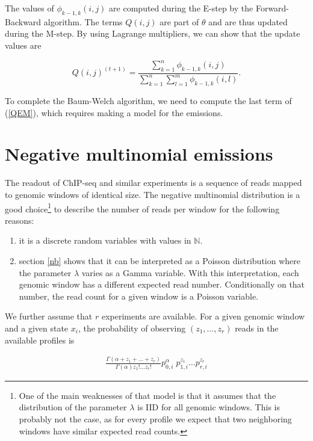 \documentclass[12pt]{article}
\begin{document}
\begin{appendices}
    The values of $\phi_{k-1,k}(i,j)$ are computed during the
    E-step by the Forward-Backward algorithm.
    The terms $Q(i,j)$ are part of $\theta$ and are thus updated
    during the M-step. By using Lagrange multipliers, we can show
    that the update values are

    $$ Q(i,j)^{(t+1)} = \frac{\sum_{k=1}^n \phi_{k-1,k}(i,j)}
      {\sum_{k=1}^n\sum_{l=1}^m\phi_{k-1,k}(i,l)}. $$
    
    To complete the Baum-Welch algorithm, we need to compute the last
    term of (\ref{QEM}), which requires making a model for the
    emissions.
    
    \section{Negative multinomial emissions}

    The readout of ChIP-seq and similar experiments is a sequence of
    reads mapped to genomic windows of identical size.
    The negative multinomial distribution is a good choice\footnote{One
    of the main weaknesses of that model is that it
    assumes that the distribution of the parameter $\lambda$ is IID
    for all genomic windows. This is probably not the case, as for
    every profile we expect that two neighboring windows have similar
    expected read counts.} to describe
    the number of reads per window for the following reasons:

    \begin{enumerate}
      \item it is a discrete random variables with values in
        $\mathbb{N}$.
      \item section \ref{nb} shows that it can be interpreted as a
        Poisson distribution where the parameter $\lambda$ varies
        as a Gamma variable. With this interpretation, each
        genomic window has a different expected read number.
        Conditionally on that number, the read count for a given
        window is a Poisson variable.
    \end{enumerate}


    We further assume that $r$ experiments are available.
    For a given genomic window and a given state $x_i$, the
    probability of observing $(z_1, \ldots, z_r)$ reads in the
    available profiles is

    \begin{align*}
      \frac{\Gamma(\alpha+z_1+\ldots+z_r)}
      {\Gamma(\alpha)z_1! \ldots z_r!}
      p_{0,i}^{\alpha} \; p_{1,i}^{z_1} \ldots p_{r,i}^{z_r}
    \end{align*}


\end{appendices}
\end{document}
